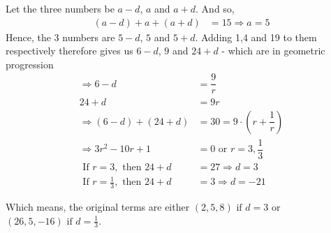 \begin{solution}[\halfpage]
	Let the three numbers be $a-d$, $a$ and $a+d$. And so,
	\begin{align}
		(a-d) + a + (a+d) &= 15 \Rightarrow a = 5
	\end{align}
	Hence, the 3 numbers are $5-d$, $5$ and $5+d$. Adding 1,4 and 19 to them respectively therefore gives us
	$6-d$, $9$ and $24+d$ - which are in geometric progression
	\begin{align}
		\Rightarrow 6-d &= \dfrac{9}{r} \\
		24+d &= 9r \\
		\Rightarrow (6-d) + (24+d) &= 30 = 9\cdot\left( r + \dfrac{1}{r}\right) \\
		\Rightarrow 3r^2 - 10r + 1 &= 0 \text{ or } r = 3, \dfrac{1}{3} \\
		\text{ If } r = 3, \text{ then } 24 + d &= 27 \Rightarrow d = 3 \\
		\text{ If } r = \frac{1}{3}, \text{ then } 24 + d &= 3 \Rightarrow d = -21
	\end{align}
	
	Which means, the original terms are either $(2,5,8) \text{ if } d = 3$ or $(26,5,-16) \text{ if } d = \frac{1}{3}$.	
\end{solution}
